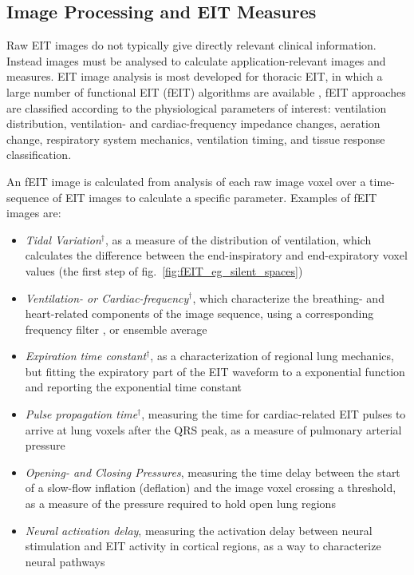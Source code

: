 \documentclass[10pt,journal]{IEEEtran}\def\TBLWIDA{15mm}\def\TBLWIDB{60mm}
\newcommand\fref[1]{fig.\ \ref{#1}}
\begin{document}
\subsection{Image Processing and EIT Measures}

Raw EIT images do not typically give directly relevant clinical information.
Instead images must be analysed to calculate application-relevant images
and measures. 
EIT image analysis is most developed for thoracic EIT, in which a
large number of functional EIT (fEIT) algorithms are available
\cite{Frerichs2017Chest},
fEIT approaches are classified according to the 
physiological parameters of interest: ventilation distribution,
ventilation- and cardiac-frequency impedance changes, 
aeration change, respiratory system mechanics, ventilation
timing, and tissue response classification.

An fEIT image is calculated from  analysis of each raw image voxel
over a time-sequence
of EIT images to calculate a specific parameter.
 Examples of fEIT images are:
\begin{itemize}
\item
{\em Tidal Variation}$^\dagger$, as a measure of the
distribution of ventilation, which calculates
the difference between the end-inspiratory and
end-expiratory voxel values \cite{Hahn1995Distribution}
(the first step of \fref{fig:fEIT_eg_silent_spaces})
\item
{\em Ventilation- or Cardiac-frequency}$^\dagger$, which
 characterize the breathing- and heart-related components
of the image sequence, using a corresponding frequency
filter \cite{Ferrario2012morphological}, or ensemble average 
\item
{\em Expiration time constant}$^\dagger$, as a characterization
of regional lung mechanics, but fitting the expiratory part of
the EIT waveform to a exponential function and reporting the
exponential time constant \cite{Pulletz2012Dynamics}
\item
{\em Pulse propagation time}$^\dagger$, measuring the time for cardiac-related
EIT pulses to arrive at lung voxels after the QRS peak, as a measure of pulmonary
arterial pressure \cite{Proenca2016Noninvasive} 
\item
{\em Opening- and Closing Pressures}, measuring the time delay
between the start of a slow-flow inflation (deflation) and the image voxel
crossing a threshold, as a measure of the pressure required to hold
open lung regions \cite{Pulletz2012Opening}  
\item
{\em Neural activation delay}, measuring the activation delay between
neural stimulation and EIT activity in cortical regions, as
a way to characterize neural pathways \cite{Aristovich2014Neural}
\end{itemize}
\end{document}
